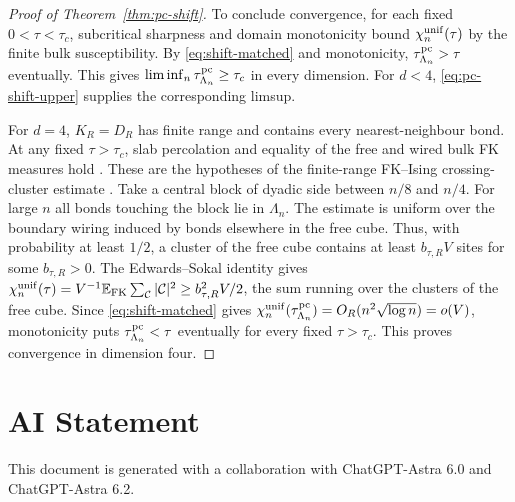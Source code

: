 \documentclass[11pt]{article}
\numberwithin{equation}{section}
\newcommand{\E}{\mathbb E}
\begin{document}
\begin{proof}[Proof of Theorem~\ref{thm:pc-shift}]
To conclude convergence, for each fixed $0<\tau<\tau_c$,
subcritical sharpness \cite[Theorem~2.1(2)]{sharpness} and domain
monotonicity bound $\chi_n^{\rm unif}(\tau)$ by the finite bulk
susceptibility. By \eqref{eq:shift-matched} and monotonicity,
$\tau_{\Lambda_n}^{\rm pc}>\tau$ eventually. This gives
$\liminf_n\tau_{\Lambda_n}^{\rm pc}\ge\tau_c$ in every dimension.
For $d<4$, \eqref{eq:pc-shift-upper} supplies the corresponding limsup.

For $d=4$, $K_R=D_R$ has finite range and contains every nearest-neighbour
bond. At any fixed $\tau>\tau_c$, slab percolation and equality of the
free and wired bulk FK measures hold \cite[Sections~2.1--2.3]{bodineau-finite}.
These are the hypotheses of the finite-range FK--Ising crossing-cluster
estimate \cite[Section~3.2, Eq.~(3.6)]{crossing-cluster}.
Take a central block of dyadic side between $n/8$ and $n/4$. For large
$n$ all bonds touching the block lie in $\Lambda_n$. The estimate is
uniform over the boundary wiring induced by bonds elsewhere in the
free cube. Thus, with probability at least $1/2$, a cluster of the
free cube contains at least $b_{\tau,R}V$ sites for some $b_{\tau,R}>0$.
The Edwards--Sokal identity gives
$\chi_n^{\rm unif}(\tau)=V^{-1}\E_{\rm FK}\sum_{\mathcal C}|\mathcal C|^2
\ge b_{\tau,R}^2V/2$, the sum running over the clusters of the free cube.
Since \eqref{eq:shift-matched} gives
$\chi_n^{\rm unif}(\tau_{\Lambda_n}^{\rm pc})=O_R(n^2\sqrt{\log n})=o(V)$,
monotonicity puts $\tau_{\Lambda_n}^{\rm pc}<\tau$ eventually for every
fixed $\tau>\tau_c$. This proves convergence in dimension four.
\end{proof}

\section*{AI Statement}

This document is generated with a collaboration with ChatGPT-Astra 6.0 and ChatGPT-Astra 6.2.
\end{document}
